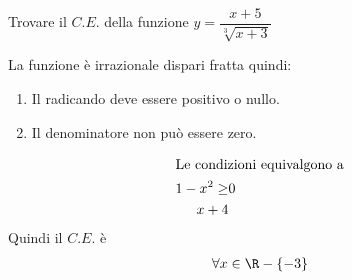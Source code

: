 	Trovare il $C.E.$ della funzione $y=\dfrac{x+5}{\sqrt[3]{x+3}}$
	
	La funzione è irrazionale dispari fratta quindi:
	\begin{enumerate}
	\item Il radicando deve essere positivo o nullo.
	\item Il denominatore non può essere zero.
\end{enumerate}
	\begin{align*}
	\intertext{Le condizioni equivalgono a}
1-x^2\geq&0\\
x+4
	\end{align*}
	Quindi il $C.E.$ è
\begin{align*}
\forall x\in\R-\lbrace-3&\rbrace\\
\end{align*}
	
